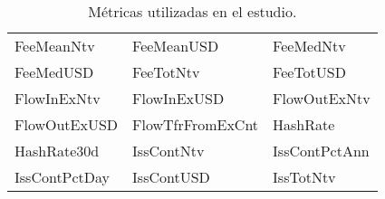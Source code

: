 \begin{table}[ht]
\begin{tabular}{p{5cm} p{5cm} p{5cm}}
		FeeMeanNtv & FeeMeanUSD & FeeMedNtv \\ FeeMedUSD & FeeTotNtv & FeeTotUSD \\
		FlowInExNtv & FlowInExUSD &
		FlowOutExNtv \\
		
		FlowOutExUSD &
		FlowTfrFromExCnt & HashRate \\
		
		HashRate30d & IssContNtv &
		IssContPctAnn \\
		
		IssContPctDay &
		IssContUSD & IssTotNtv \\
		\bottomrule
		\end{tabular}
	\caption{Métricas utilizadas en el estudio.}
	\label{tab:Table13}
\end{table}

